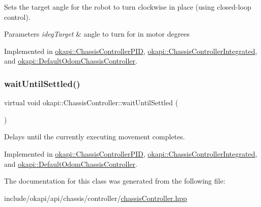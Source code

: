 Sets the target angle for the robot to turn clockwise in place (using closed-\/loop control).


\begin{DoxyParams}{Parameters}
{\em ideg\+Target} & angle to turn for in motor degrees \\
\hline
\end{DoxyParams}


Implemented in \mbox{\hyperlink{classokapi_1_1ChassisControllerPID_a3a16a11e8b0e11dbfb2a03b5685e509b}{okapi\+::\+Chassis\+Controller\+P\+ID}}, \mbox{\hyperlink{classokapi_1_1ChassisControllerIntegrated_abd638be1352919fb211e9b70c181d940}{okapi\+::\+Chassis\+Controller\+Integrated}}, and \mbox{\hyperlink{classokapi_1_1DefaultOdomChassisController_a948978204fc6f2a2443025dfdb0241b1}{okapi\+::\+Default\+Odom\+Chassis\+Controller}}.

\mbox{\label{classokapi_1_1ChassisController_a01ed4e0eb7332cc149228387bbf1e91c}} 
\subsubsection{\texorpdfstring{waitUntilSettled()}{waitUntilSettled()}}
{\footnotesize\ttfamily virtual void okapi\+::\+Chassis\+Controller\+::wait\+Until\+Settled (\begin{DoxyParamCaption}{ }\end{DoxyParamCaption})\hspace{0.3cm}{\ttfamily [pure virtual]}}

Delays until the currently executing movement completes. 

Implemented in \mbox{\hyperlink{classokapi_1_1ChassisControllerPID_a964cc8132bfa76492df0ee06aadb255a}{okapi\+::\+Chassis\+Controller\+P\+ID}}, \mbox{\hyperlink{classokapi_1_1ChassisControllerIntegrated_a2af994f5ddc68a48d7692fd16ca590c0}{okapi\+::\+Chassis\+Controller\+Integrated}}, and \mbox{\hyperlink{classokapi_1_1DefaultOdomChassisController_a44599379129060bdb44e6f603ee5777b}{okapi\+::\+Default\+Odom\+Chassis\+Controller}}.



The documentation for this class was generated from the following file\+:\begin{DoxyCompactItemize}
\item 
include/okapi/api/chassis/controller/\mbox{\hyperlink{chassisController_8hpp}{chassis\+Controller.\+hpp}}\end{DoxyCompactItemize}
